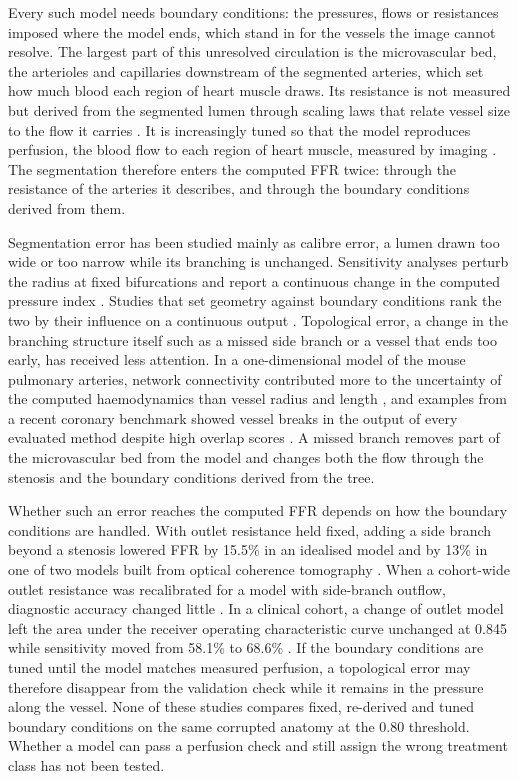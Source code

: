 \documentclass[journal]{IEEEtran}
\begin{document}
Every such model needs boundary conditions: the pressures, flows or resistances imposed where the model ends, which
stand in for the vessels the image cannot resolve. The largest part of this unresolved circulation is the
microvascular bed, the arterioles and capillaries downstream of the segmented arteries, which set how much blood
each region of heart muscle draws. Its resistance is not measured but derived from the segmented lumen through
scaling laws that relate vessel size to the flow it carries \cite{murray1926,kim2010}. It is increasingly tuned so
that the model reproduces perfusion, the blood flow to each region of heart muscle, measured by imaging
\cite{menon2024}. The segmentation therefore enters the computed FFR twice: through the resistance of
the arteries it describes, and through the boundary conditions derived from them.

Segmentation error has been studied mainly as calibre error, a lumen drawn too wide or too narrow while its
branching is unchanged. Sensitivity analyses perturb the radius at fixed bifurcations and report a continuous change in the computed pressure index \cite{sankaran2015tmi,sankaran2015cmame,fernandez2024,dalmaso2025}. Studies that set geometry against
boundary conditions rank the two by their influence on a continuous output \cite{sankaran2016,tanade2022,korte2023}. Topological error, a change in the branching structure itself such as a missed side branch or a vessel that ends too early, has received less attention. In a one-dimensional model of the mouse pulmonary arteries, network connectivity contributed more to the uncertainty of the computed haemodynamics than vessel radius and length \cite{colebank2019}, and examples from a recent coronary benchmark showed vessel breaks in the output of every evaluated method despite high overlap scores \cite{bransby2026}. A missed branch removes part of the microvascular bed from the model and changes both the flow
through the stenosis and the boundary conditions derived from the tree.

Whether such an error reaches the computed FFR depends on how the boundary conditions are handled. With outlet resistance held fixed, adding a side branch beyond a stenosis lowered FFR by 15.5\% in an idealised model and by 13\% in one of two models built from optical coherence tomography \cite{gamage2022}. When a cohort-wide outlet resistance was recalibrated for a model with side-branch outflow, diagnostic accuracy changed little \cite{gosling2020}. In a clinical cohort, a change of outlet
model left the area under the receiver operating characteristic curve unchanged at 0.845 while sensitivity moved
from 58.1\% to 68.6\% \cite{fossan2026}. If the boundary conditions are tuned until the model matches measured
perfusion, a topological error may therefore disappear from the validation check while it remains in the pressure
along the vessel. None of these studies compares fixed, re-derived and tuned boundary conditions on the same
corrupted anatomy at the 0.80 threshold. Whether a model can pass a perfusion check and still assign the wrong
treatment class has not been tested.
\end{document}
